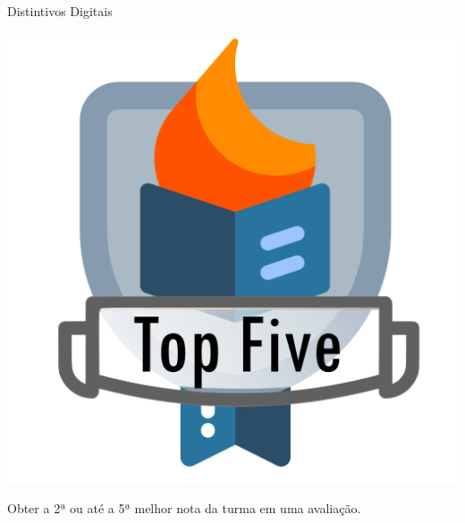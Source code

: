 \documentclass[xcolor=dvipsnames,table]{beamer}
\begin{document}
	\begin{frame}{Distintivos Digitais}
		\begin{block}{}
			\begin{center}
				\includegraphics[height=.65\textheight]{images/badges/top-five.png}
			\end{center}		
			Obter a 2ª ou até a 5ª melhor nota da turma em uma avaliação. 
		\end{block}
	\end{frame}
	
\end{document}

